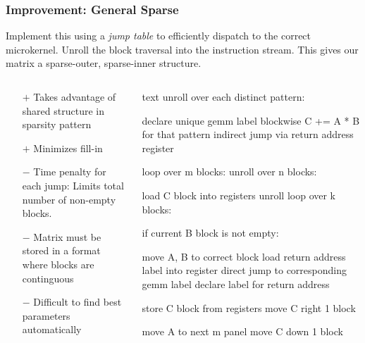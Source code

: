 \documentclass[9pt]{beamer}
\begin{document}
\begin{frame}[fragile]
  \frametitle{Improvement: General Sparse}
  Implement this using a \emph{jump table} to efficiently dispatch to the correct microkernel. Unroll the block traversal into the instruction stream. This gives our matrix a sparse-outer, sparse-inner structure.


  \begin{columns}[t]%
    \begin{column}{0.4\textwidth}
      \begin{itemize}
  \item[$+$] Takes advantage of shared structure in sparsity pattern
  \item[$+$] Minimizes fill-in

  \item[$-$] Time penalty for each jump: Limits total number of non-empty blocks.
  \item[$-$] Matrix must be stored in a format where blocks are continguous
  \item[$-$] Difficult to find best parameters automatically
      \end{itemize}
    \end{column}
    \begin{column}{0.6\textwidth}
      \begin{ccode}[]
        {text}
        unroll over each distinct pattern:

           declare unique gemm label
           blockwise C += A * B for that pattern
           indirect jump via return address register

        loop over m blocks:
           unroll over n blocks:

              load C block into registers
              unroll loop over k blocks:

                 if current B block is not empty:

                    move A, B to correct block
                    load return address label into register
                    direct jump to corresponding gemm label
                    declare label for return address

              store C block from registers
              move C right 1 block

           move A to next m panel
           move C down 1 block
      \end{ccode}
    \end{column}
  \end{columns}

\end{frame}
\end{document}
